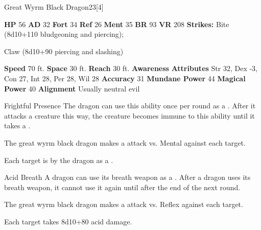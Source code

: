   \begin{monsubsection}{Great Wyrm Black Dragon}{23}[4]
    \vspace{-1em}\vspace{-1em}
    \vspace{0em}

    
    

    \begin{spellcontent}
      \begin{spelltargetinginfo}
        \pari \textbf{HP} 56 \monsep
          \textbf{AD} 32 \monsep
          \textbf{Fort} 34 \monsep
          \textbf{Ref} 26 \monsep
          \textbf{Ment} 35
        \pari \textbf{BR} 93 \monsep
        \textbf{VR} 208
        \pari \textbf{Strikes:}
            Bite  (8d10+110 bludgeoning and piercing);
\par Claw  (8d10+90 piercing and slashing)
      \end{spelltargetinginfo}
    \end{spellcontent}
    \begin{monsterfooter}
      \pari \textbf{Speed} 70 ft. \monsep
        \textbf{Space} 30 ft. \monsep
        \textbf{Reach} 30 ft.
      \pari \textbf{Awareness} 
      \pari \textbf{Attributes}
        Str 32, Dex -3,
        Con 27, Int 28,
        Per 28, Wil 28
      \pari \textbf{Accuracy} 31 \monsep
        \textbf{Mundane Power} 44 \monsep
      \textbf{Magical Power} 40
      \pari \textbf{Alignment} Usually neutral evil
    \end{monsterfooter}
  \end{monsubsection}
  \begin{freeability}{Frightful Presence}
      The dragon can use this ability once per round as a .
      After it attacks a creature this way, the creature becomes immune to this ability until it takes a .
      \par The great wyrm black dragon makes a  attack
        vs. Mental against each target.
    
    \hit Each target is  by the dragon as a .
    \end{freeability}
  

    \begin{freeability}{Acid Breath}
      A dragon can use its breath weapon as a .
      After a dragon uses its breath weapon, it cannot use it again until after the end of the next round.
      \par The great wyrm black dragon makes a  attack
        vs. Reflex against each target.
    
    \hit Each target takes 8d10+80 acid damage.
    \end{freeability}
  
